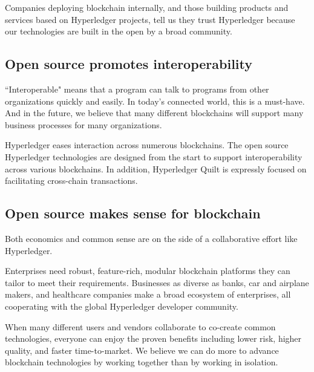 Companies deploying blockchain internally, and those building products and services based on Hyperledger projects, tell us they trust Hyperledger because our technologies are built in the open by a broad community. 

\subsection{Open source promotes interoperability}
``Interoperable" means that a program can talk to programs from other organizations quickly and easily. In today's connected world, this is a must-have.
And in the future, we believe that many different blockchains will support many business processes for many organizations. 

Hyperledger eases interaction across numerous blockchains. The open source Hyperledger technologies are designed from the start to support interoperability across various blockchains.  In addition, Hyperledger Quilt is expressly focused on facilitating cross-chain transactions.

\subsection{Open source makes sense for blockchain}
Both economics and common sense are on the side of a collaborative effort like Hyperledger. 

Enterprises need robust, feature-rich, modular blockchain platforms they can tailor to meet their requirements. 
Businesses as diverse as banks, car and airplane makers, and healthcare companies make a broad ecosystem of enterprises, all cooperating with the global Hyperledger developer community.

When many different users and vendors collaborate to co-create common technologies, everyone can enjoy the proven benefits including lower risk, higher quality, and faster time-to-market. 
We believe we can do more to advance blockchain technologies by working together than by working in isolation. 
